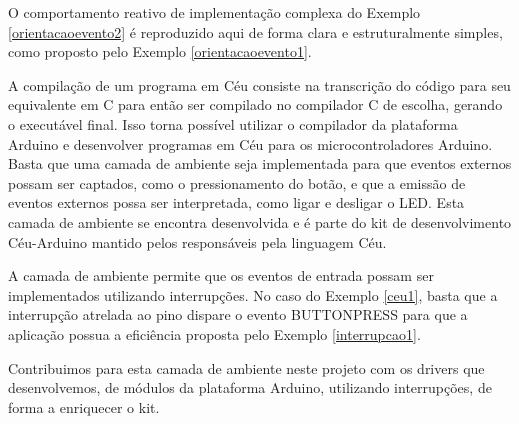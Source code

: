 \documentclass[11pt]{article}
\begin{document}
\par O comportamento reativo de implementação complexa do Exemplo \ref{orientacaoevento2} é reproduzido aqui de forma clara e estruturalmente simples, como proposto pelo Exemplo \ref{orientacaoevento1}.
\par A compilação de um programa em Céu consiste na transcrição do código para seu equivalente em C para então ser compilado no compilador C de escolha, gerando o executável final. Isso torna possível utilizar o compilador da plataforma Arduino e desenvolver programas em Céu para os microcontroladores Arduino. Basta que uma camada de ambiente seja implementada para que eventos externos possam ser captados, como o pressionamento do botão, e que a emissão de eventos externos possa ser interpretada, como ligar e desligar o LED. Esta camada de ambiente se encontra desenvolvida e é parte do kit de desenvolvimento Céu-Arduino mantido pelos responsáveis pela linguagem Céu\cite{githubceuarduino}.
\par A camada de ambiente permite que os eventos de entrada possam ser implementados utilizando interrupções. No caso do Exemplo \ref{ceu1}, basta que a interrupção atrelada ao pino dispare o evento BUTTON\textunderscore PRESS para que a aplicação possua a eficiência proposta pelo Exemplo \ref{interrupcao1}.
\par Contribuimos para esta camada de ambiente neste projeto com os drivers que desenvolvemos, de módulos da plataforma Arduino, utilizando interrupções, de forma a enriquecer o kit.
\end{document}
